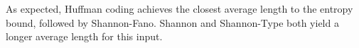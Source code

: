 \documentclass{AnantDocumentation}
\begin{document}
As expected, Huffman coding achieves the closest average length to the entropy bound, followed by Shannon-Fano. Shannon and Shannon-Type both yield a longer average length for this input.

\printbibliography
\end{document}
